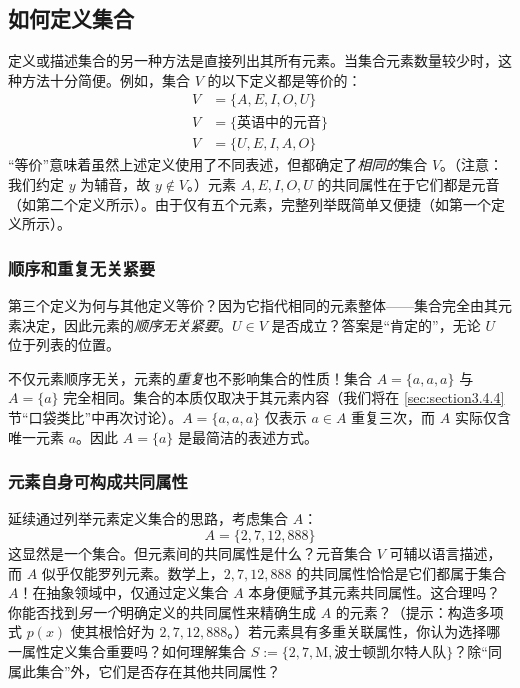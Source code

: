 \subsection{如何定义集合}

定义或描述集合的另一种方法是直接列出其所有元素。当集合元素数量较少时，这种方法十分简便。例如，集合 $V$ 的以下定义都是等价的：
\begin{align*}
    V &= \{A,E,I,O,U\}\\
    V &= \{\text{英语中的元音}\}\\
    V &= \{U,E,I,A,O\}
\end{align*}
``等价''意味着虽然上述定义使用了不同表述，但都确定了\emph{相同的}集合 $V$。（注意：我们约定 $y$ 为辅音，故 $y \notin V$。）元素 $A, E, I, O, U$ 的共同属性在于它们都是元音（如第二个定义所示）。由于仅有五个元素，完整列举既简单又便捷（如第一个定义所示）。

\subsubsection*{顺序和重复无关紧要}

第三个定义为何与其他定义等价？因为它指代相同的元素整体——集合完全由其元素决定，因此元素的\emph{顺序无关紧要}。$U \in V$ 是否成立？答案是``肯定的''，无论 $U$ 位于列表的位置。

不仅元素顺序无关，元素的\emph{重复}也不影响集合的性质！集合 $A=\{a,a,a\}$ 与 $A=\{a\}$ 完全相同。集合的本质仅取决于其元素内容（我们将在 \ref{sec:section3.4.4} 节``口袋类比''中再次讨论）。$A = \{a, a, a\}$ 仅表示 $a \in A$ 重复三次，而 $A$ 实际仅含唯一元素 $a$。因此 $A = \{a\}$ 是最简洁的表述方式。

\subsubsection*{元素自身可构成共同属性}

延续通过列举元素定义集合的思路，考虑集合 $A$：
\[A=\{2, 7, 12, 888\}\]
这显然是一个集合。但元素间的共同属性是什么？元音集合 $V$ 可辅以语言描述，而 $A$ 似乎仅能罗列元素。数学上，$2,7,12,888$ 的共同属性恰恰是它们都属于集合 $A$！在抽象领域中，仅通过定义集合 $A$ 本身便赋予其元素共同属性。这合理吗？你能否找到\emph{另一个}明确定义的共同属性来精确生成 $A$ 的元素？（提示：构造多项式 $p(x)$ 使其根恰好为 $2,7,12,888$。）若元素具有多重关联属性，你认为选择哪一属性定义集合重要吗？如何理解集合 $S := \{2, 7, \text{M}, \text{波士顿凯尔特人队}\}$？除``同属此集合''外，它们是否存在其他共同属性？

